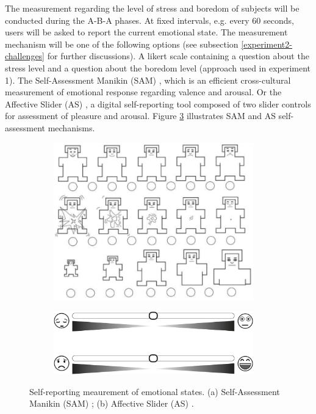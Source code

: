 The measurement regarding the level of stress and boredom of subjects will be conducted during the A-B-A phases. At fixed intervals, e.g. every 60 seconds, users will be asked to report the current emotional state. The measurement mechanism will be one of the following options (see subsection \ref{experiment2-challenges} for further discussions). A likert scale containing a question about the stress level and a question about the boredom level (approach used in experiment 1). The Self-Assessment Manikin (SAM) \parencite{morris1995observations}, which is an efficient cross-cultural measurement of emotional response regarding valence and arousal. Or the Affective Slider (AS) \parencite{betella2016affective}, a digital self-reporting tool composed of two slider controls for assessment of pleasure and arousal. Figure \ref{fig:sam-as} illustrates SAM and AS self-assessment mechanisms.

\begin{figure}[h]
\centering
  \begin{subfigure}[b]{0.5\textwidth}
    \includegraphics[width=0.95\textwidth]{figures/SAM.png}
    \caption{}
    \label{fig:sam}
  \end{subfigure}%
  \begin{subfigure}[b]{0.5\textwidth}
    \centering
    \includegraphics[width=0.95\textwidth]{figures/AS.png}
    \caption{}
    \label{fig:as}
  \end{subfigure}
  \caption{Self-reporting meaurement of emotional states. (a) Self-Assessment Manikin (SAM) \parencite{morris1995observations}; (b) Affective Slider (AS) \parencite{betella2016affective}.}
  \label{fig:sam-as}
\end{figure}

